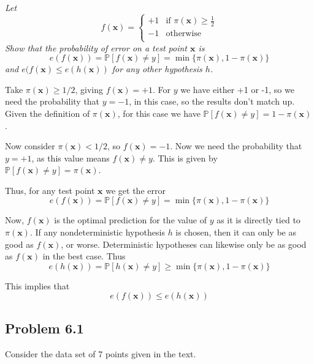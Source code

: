 \documentclass{article}
\renewcommand{\vec}[1]{\mathbf{#1}}
\begin{document}
\smallskip

\textit{Let
\[
  f(\vec{x}) = 
  \begin{cases}
    +1 & \text{if } \pi(\vec{x}) \geq \frac{1}{2} \\
    -1 & \text{otherwise} \\
  \end{cases}
\]
Show that the probability of error on a test point $\vec{x}$ is 
\[
  e(f(\vec{x})) = \mathbb{P}[f(\vec{x}) \neq y] = \min\{\pi(\vec{x}), 1-\pi(\vec{x})\}
\]
and $e(f(\vec{x}) \leq e(h(\vec{x}))$ for any other hypothesis $h$.}

\bigskip

Take $\pi(\vec{x}) \geq 1/2$, giving $f(\vec{x}) = +1$. For $y$ we have either +1 or -1, so we
need the probability that $y = -1$, in this case, so the results don't match up. Given the 
definition of $\pi(\vec{x})$, for this case we have $\mathbb{P}[f(\vec{x}) \neq y] = 1 - 
\pi(\vec{x})$.

Now consider $\pi(\vec{x}) < 1/2$, so $f(\vec{x}) = -1$. Now we need the probability that $y=+1$,
as this value means $f(\vec{x}) \neq y$. This is given by $\mathbb{P}[f(\vec{x}) \neq y] = 
\pi(\vec{x})$.

Thus, for any test point $\vec{x}$ we get the error
\[
  e(f(\vec{x})) = \mathbb{P}[f(\vec{x}) \neq y] = \min\{\pi(\vec{x}), 1-\pi(\vec{x})\}
\]

Now, $f(\vec{x})$ is the optimal prediction for the value of $y$ as it is directly tied to 
$\pi(\vec{x})$. If any nondeterministic hypothesis $h$ is chosen, then it can only be as good
as $f(\vec{x})$, or worse. Deterministic hypotheses can likewise only be as good as $f(\vec{x})$ 
in the best case. Thus
\[
  e(h(\vec{x})) = \mathbb{P}[h(\vec{x}) \neq y] \geq \min\{\pi(\vec{x}), 1-\pi(\vec{x})\}
\]

This implies that 
\[
  e(f(\vec{x})) \leq e(h(\vec{x}))
\]

\subsection*{Problem 6.1}

\smallskip

Consider the data set of 7 points given in the text.
\end{document}
